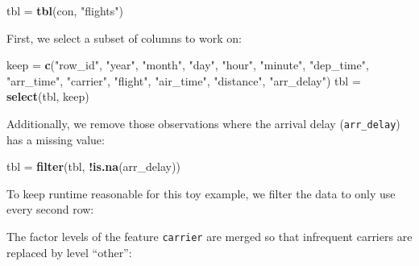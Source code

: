 \documentclass[]{scrbook}
\newenvironment{Shaded}{\begin{snugshade}}{\end{snugshade}}
\newcommand{\DecValTok}[1]{\textcolor[rgb]{0.00,0.00,0.81}{#1}}
\newcommand{\KeywordTok}[1]{\textcolor[rgb]{0.13,0.29,0.53}{\textbf{#1}}}
\newcommand{\NormalTok}[1]{#1}
\newcommand{\OperatorTok}[1]{\textcolor[rgb]{0.81,0.36,0.00}{\textbf{#1}}}
\newcommand{\StringTok}[1]{\textcolor[rgb]{0.31,0.60,0.02}{#1}}
\renewenvironment{Shaded} {\begin{snugshade}\small} {\end{snugshade}}
\begin{document}
\begin{Shaded}
\begin{Highlighting}[]
\NormalTok{tbl =}\StringTok{ }\KeywordTok{tbl}\NormalTok{(con, }\StringTok{"flights"}\NormalTok{)}
\end{Highlighting}
\end{Shaded}

First, we select a subset of columns to work on:

\begin{Shaded}
\begin{Highlighting}[]
\NormalTok{keep =}\StringTok{ }\KeywordTok{c}\NormalTok{(}\StringTok{"row_id"}\NormalTok{, }\StringTok{"year"}\NormalTok{, }\StringTok{"month"}\NormalTok{, }\StringTok{"day"}\NormalTok{, }\StringTok{"hour"}\NormalTok{, }\StringTok{"minute"}\NormalTok{, }\StringTok{"dep_time"}\NormalTok{,}
  \StringTok{"arr_time"}\NormalTok{, }\StringTok{"carrier"}\NormalTok{, }\StringTok{"flight"}\NormalTok{, }\StringTok{"air_time"}\NormalTok{, }\StringTok{"distance"}\NormalTok{, }\StringTok{"arr_delay"}\NormalTok{)}
\NormalTok{tbl =}\StringTok{ }\KeywordTok{select}\NormalTok{(tbl, keep)}
\end{Highlighting}
\end{Shaded}

Additionally, we remove those observations where the arrival delay (\texttt{arr\_delay}) has a missing value:

\begin{Shaded}
\begin{Highlighting}[]
\NormalTok{tbl =}\StringTok{ }\KeywordTok{filter}\NormalTok{(tbl, }\OperatorTok{!}\KeywordTok{is.na}\NormalTok{(arr_delay))}
\end{Highlighting}
\end{Shaded}

To keep runtime reasonable for this toy example, we filter the data to only use every second row:

\begin{Shaded}
\end{Shaded}

The factor levels of the feature \texttt{carrier} are merged so that infrequent carriers are replaced by level ``other'':
\end{document}
